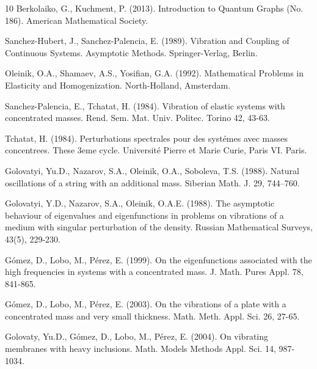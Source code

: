 \documentclass[reqno]{amsart}
\theoremstyle{definition}
\theoremstyle{remark}
\numberwithin{equation}{section}
\begin{document}
\begin{thebibliography}{10}
    Berkolaiko, G.,  Kuchment, P. (2013). Introduction to Quantum Graphs (No. 186). American Mathematical Society.



   


    Sanchez-Hubert, J., Sanchez-Palencia, E.  (1989). Vibration and Coupling of Continuous Systems. Asymptotic Methods. Springer-Verlag, Berlin.
    
    Oleinik, O.A., Shamaev, A.S., Yosifian, G.A.  (1992). Mathematical Problems in Elasticity and Homogenization. North-Holland, Amsterdam.


    Sanchez-Palencia, E., Tchatat, H. (1984). Vibration of elastic systems with concentrated masses. Rend. Sem. Mat. Univ. Politec. Torino 42, 43-63.

    Tchatat, H. (1984). Perturbations spectrales pour des syst\'emes avec masses concentrees. These 3eme cycle. Universit\'e Pierre et Marie Curie, Paris VI. Paris.


    Golovatyi, Yu.D.,  Nazarov, S.A.,  Oleinik, O.A.,  Soboleva, T.S. (1988). Natural oscillations of a string with an additional mass. Siberian Math. J. 29,  744–760.
 
    Golovatyi, Y.D., Nazarov, S.A., Oleinik, O.A.E. (1988). The asymptotic behaviour of eigenvalues and eigenfunctions in problems on vibrations of a medium with singular perturbation of the density. Russian Mathematical Surveys, 43(5), 229-230.

    G\'omez, D., Lobo, M., P\'erez, E. (1999). On the eigenfunctions associated with the high frequencies in systems with a concentrated mass. J. Math. Pures Appl. 78, 841-865.

    
    G\'omez, D.,  Lobo, M., P\'erez, E. (2003). On the vibrations of a plate with a concentrated mass and very small thickness. Math. Meth. Appl. Sci. 26, 27-65.

    

    Golovaty, Yu.D., G\'omez, D., Lobo, M., P\'erez, E. (2004). On vibrating membranes with heavy inclusions. Math. Models Methods Appl. Sci. 14, 987-1034.


\end{thebibliography}
\end{document}
